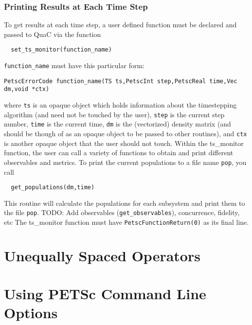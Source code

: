 \documentclass{article}
\begin{document}
\subsubsection{Printing Results at Each Time Step}
To get results at each time step, a user defined function must be declared and passed to
QuaC via the function
\begin{lstlisting}
  set_ts_monitor(function_name)
\end{lstlisting}
\texttt{function\_name} must have this particular form:
\begin{lstlisting}
PetscErrorCode function_name(TS ts,PetscInt step,PetscReal time,Vec dm,void *ctx)
\end{lstlisting}
where \texttt{ts} is an opaque object which holds information about the timestepping algorithm
(and need not be touched by the user), \texttt{step} is the current step number,
\texttt{time} is the current time, \texttt{dm} is the (vectorized) density matrix (and should
be though of as an opaque object to be passed to other routines), and \texttt{ctx} is another
opaque object that the user should not touch. Within the ts\_monitor function,
the user can
call a variety of functions to obtain and print different observables and metrics.
To print the current populations to a file name \texttt{pop}, you call
\begin{lstlisting}
  get_populations(dm,time)
\end{lstlisting}
This routine will calculate the populations for each subsystem and print them to the file
\texttt{pop}. TODO: Add observables (\texttt{get\_observables}), concurrence, fidelity, etc
The ts\_monitor function must have \texttt{PetscFunctionReturn(0)} as its final line.

\section{Unequally Spaced Operators}

\section{Using PETSc Command Line Options}
\end{document}
